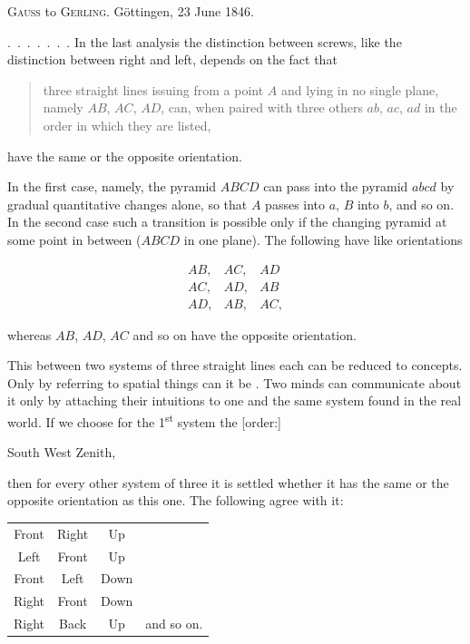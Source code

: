 %
\begin{center}
\textsc{Gauss} to \textsc{Gerling}. Göttingen, 23 June 1846.
\end{center}

\mbox{.\ .\ .\ .\ .\ .\ .} In the last analysis the distinction between screws, like the distinction between right and left, depends on the fact that

\begin{quote}
three straight lines issuing from a point $A$ and lying in no single plane, namely $AB$, $AC$, $AD$, can, when paired with three others $ab$, $ac$, $ad$ in the order in which they are listed,
\end{quote}

\begin{center}
have the same or the opposite orientation.
\end{center}

In the first case, namely, the pyramid $ABCD$ can pass into the pyramid $abcd$ by gradual quantitative changes alone, so that $A$ passes into $a$, $B$ into $b$, and so on. In the second case such a transition is possible only if the changing pyramid  at some point in between ($ABCD$ in one plane). The following have like orientations

\[
\begin{array}{ccc}
AB,&AC,&AD\\
AC,&AD,&AB\\
AD,&AB,&AC,
\end{array}
\]

whereas $AB$, $AD$, $AC$ and so on have the opposite orientation.

This  between two systems of three straight lines each can  be reduced to concepts. Only by referring to  spatial things can it be . Two minds can communicate about it only by attaching their intuitions to one and the same system found in the real world. If we choose for the 1\textsuperscript{st} system the [order:]

\begin{center}
South \qquad West \qquad Zenith,
\end{center}

then for every other system of three it is settled whether it has the same or the opposite orientation as this one. The following agree with it:

\begin{center}
\begin{tabular}{cccc}
Front & Right & Up & \\
Left & Front & Up & \\
Front & Left & Down & \\
Right & Front & Down & \\
Right & Back & Up & and so on.
\end{tabular}
\end{center}
